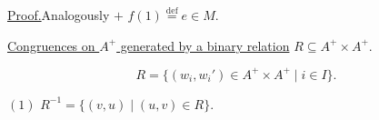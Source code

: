 \medskip
\noindent\underline{Proof.}\quad Analogously $+$
$f(1)\overset{\mathrm{def}}{=}e\in M$.

\bigskip
\noindent\underline{Congruences on $A^+$ generated by a binary relation}
$R\subseteq A^+\times A^+$.

\[
R=\bigl\{(w_i,w_i')\in A^+\times A^+\mid i\in I\bigr\}.
\]

\noindent $(1)$\quad
$R^{-1}=\bigl\{(v,u)\mid (u,v)\in R\bigr\}$.
